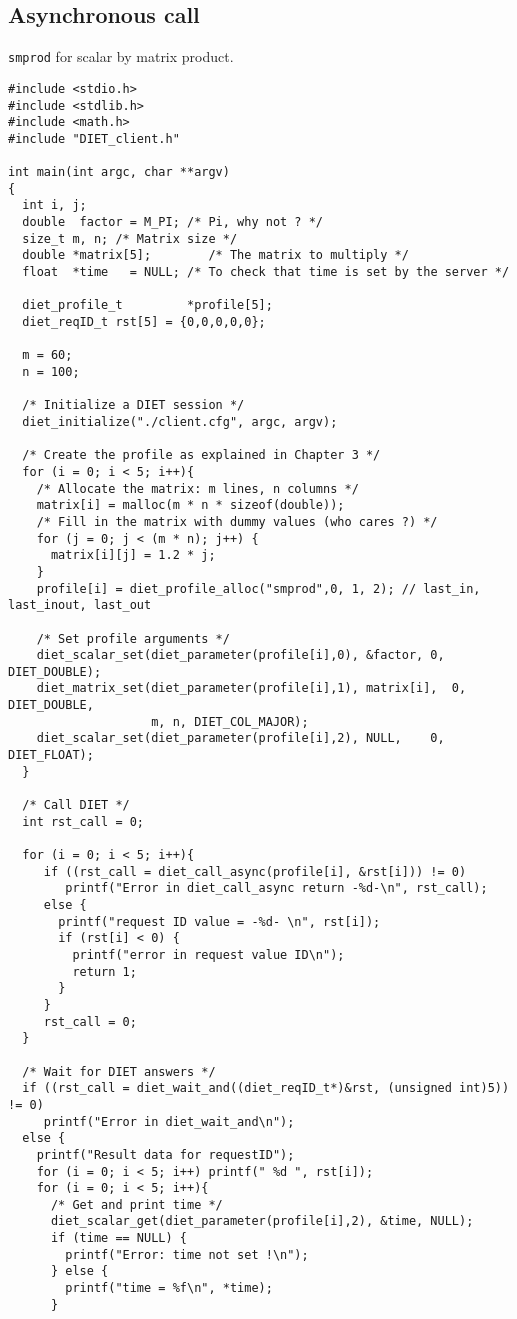 \subsection{Asynchronous call}
\texttt{smprod}
for scalar by matrix product.
{\footnotesize
\begin{verbatim}
#include <stdio.h>
#include <stdlib.h>
#include <math.h>
#include "DIET_client.h"

int main(int argc, char **argv)
{
  int i, j;
  double  factor = M_PI; /* Pi, why not ? */
  size_t m, n; /* Matrix size */
  double *matrix[5];        /* The matrix to multiply */
  float  *time   = NULL; /* To check that time is set by the server */

  diet_profile_t         *profile[5];
  diet_reqID_t rst[5] = {0,0,0,0,0};

  m = 60;
  n = 100;
 
  /* Initialize a DIET session */
  diet_initialize("./client.cfg", argc, argv);

  /* Create the profile as explained in Chapter 3 */
  for (i = 0; i < 5; i++){
    /* Allocate the matrix: m lines, n columns */
    matrix[i] = malloc(m * n * sizeof(double));
    /* Fill in the matrix with dummy values (who cares ?) */
    for (j = 0; j < (m * n); j++) {
      matrix[i][j] = 1.2 * j;
    }
    profile[i] = diet_profile_alloc("smprod",0, 1, 2); // last_in, last_inout, last_out
  
    /* Set profile arguments */
    diet_scalar_set(diet_parameter(profile[i],0), &factor, 0, DIET_DOUBLE);
    diet_matrix_set(diet_parameter(profile[i],1), matrix[i],  0, DIET_DOUBLE,
                    m, n, DIET_COL_MAJOR);
    diet_scalar_set(diet_parameter(profile[i],2), NULL,    0, DIET_FLOAT);
  }
  
  /* Call DIET */
  int rst_call = 0;
  
  for (i = 0; i < 5; i++){
     if ((rst_call = diet_call_async(profile[i], &rst[i])) != 0)  
        printf("Error in diet_call_async return -%d-\n", rst_call);
     else {
       printf("request ID value = -%d- \n", rst[i]);
       if (rst[i] < 0) {
         printf("error in request value ID\n");
         return 1;
       }
     }
     rst_call = 0;
  }   

  /* Wait for DIET answers */
  if ((rst_call = diet_wait_and((diet_reqID_t*)&rst, (unsigned int)5)) != 0)
     printf("Error in diet_wait_and\n");
  else {
    printf("Result data for requestID");
    for (i = 0; i < 5; i++) printf(" %d ", rst[i]);
    for (i = 0; i < 5; i++){
      /* Get and print time */
      diet_scalar_get(diet_parameter(profile[i],2), &time, NULL);
      if (time == NULL) {
        printf("Error: time not set !\n");
      } else {
        printf("time = %f\n", *time);
      }


\end{verbatim}}
